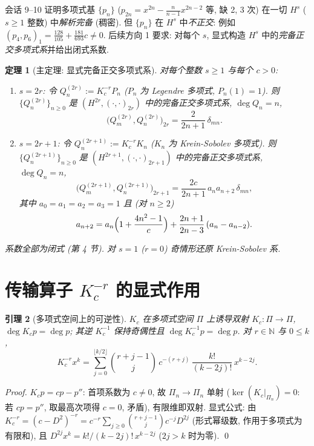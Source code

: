 \documentclass[UTF8]{ctexart}
\newtheorem{theorem}{定理}[section]
\newtheorem{lemma}[theorem]{引理}
\begin{document}
会话 9--10 证明多项式基 $\{p_n\}$ ($p_{2n} = x^{2n} - \frac{n}{n-1}x^{2n-2}$
等, 缺 2, 3 次) 在一切 $H^s$ ($s \geq 1$ 整数) 中\emph{解析完备}
(稠密). 但 $\{p_n\}$ 在 $H^s$ 中\emph{不正交}: 例如
$(p_4, p_6)_1 = \tfrac{128}{105} + \tfrac{181}{693}c \neq 0$. 后续方向 1 要求:
对每个 $s$, 显式构造 $H^s$ 中的\emph{完备正交多项式系}并给出闭式系数.
\begin{theorem}[主定理: 显式完备正交多项式系]
	对每个整数 $s \geq 1$ 与每个 $c > 0$:
	\begin{enumerate}
		\item[(偶)] $s = 2r$: 令 $Q_n^{(2r)} := K_c^{-r} P_n$
			($P_n$ 为 Legendre 多项式, $P_n(1)=1$). 则
			$\{Q_n^{(2r)}\}_{n \geq 0}$ 是 $(H^{2r}, (\cdot,\cdot)_{2r})$
			中的完备正交多项式系, $\deg Q_n = n$,
			\[
				\bigl(Q_m^{(2r)}, Q_n^{(2r)}\bigr)_{2r}
					= \frac{2}{2n+1}\, \delta_{mn}.
			\]
		\item[(奇)] $s = 2r+1$: 令 $Q_n^{(2r+1)} := K_c^{-r} K_n$
			($K_n$ 为 Krein-Sobolev 多项式). 则
			$\{Q_n^{(2r+1)}\}_{n \geq 0}$ 是 $(H^{2r+1}, (\cdot,\cdot)_{2r+1})$
			中的完备正交多项式系, $\deg Q_n = n$,
			\[
				\bigl(Q_m^{(2r+1)}, Q_n^{(2r+1)}\bigr)_{2r+1}
					= \frac{2c}{2n+1}\, a_n a_{n+2}\, \delta_{mn},
			\]
			其中 $a_0 = a_1 = a_2 = a_3 = 1$ 且 (对 $n \geq 2$)
			\[
				a_{n+2} = a_n\Bigl(1 + \frac{4n^2-1}{c}\Bigr)
					+ \frac{2n+1}{2n-3}\, (a_n - a_{n-2}).
			\]
	\end{enumerate}
	系数全部为闭式 (第 4 节). 对 $s=1$ ($r=0$) 奇情形还原 Krein-Sobolev 系.
\end{theorem}

\section{传输算子 \texorpdfstring{$K_c^{-r}$}{Kc(-r)} 的显式作用}

\begin{lemma}[多项式空间上的可逆性]
	$K_c$ 在多项式空间 $\Pi$ 上诱导双射 $K_c: \Pi \to \Pi$,
	$\deg K_c p = \deg p$; 其逆 $K_c^{-1}$ 保持奇偶性且 $\deg K_c^{-1}p = \deg p$.
	对 $r \in \mathbb{N}$ 与 $0 \leq k$,
	\begin{equation}
		K_c^{-r} x^k = \sum_{j=0}^{\lfloor k/2 \rfloor}
			\binom{r+j-1}{j}\, c^{-(r+j)}\,
			\frac{k!}{(k-2j)!}\, x^{k-2j}.
	\end{equation}
\end{lemma}

\begin{proof}
	$K_c p = cp - p''$: 首项系数为 $c \neq 0$, 故 $\Pi_n \to \Pi_n$ 单射
	($\ker(K_c|_{\Pi_n}) = 0$: 若 $cp = p''$, 取最高次项得 $c = 0$, 矛盾),
	有限维即双射. 显式公式: 由
	$K_c^{-r} = (c - D^2)^{-r} = c^{-r} \sum_{j \geq 0}
	\binom{r+j-1}{j} c^{-j} D^{2j}$ (形式幂级数, 作用于多项式为有限和),
	且 $D^{2j} x^k = k!/(k-2j)!\, x^{k-2j}$ ($2j > k$ 时为零). \qed
\end{proof}
\end{document}

